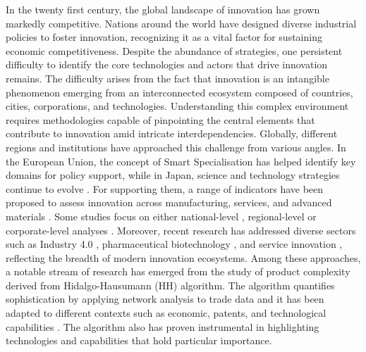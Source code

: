 \documentclass[fleqn,10pt]{wlscirep}
\begin{document}
In the twenty first century, the global landscape of innovation has grown markedly competitive. 
Nations around the world have designed diverse industrial policies to foster innovation, recognizing it as a vital factor for sustaining economic competitiveness. 
Despite the abundance of strategies, one persistent difficulty to identify the core technologies and actors that drive innovation remains. 
The difficulty arises from the fact that innovation is an intangible phenomenon emerging from an interconnected ecosystem composed of countries, cities, corporations, and technologies. 
Understanding this complex environment requires methodologies capable of pinpointing the central elements that contribute to innovation amid intricate interdependencies.
Globally, different regions and institutions have approached this challenge from various angles. 
In the European Union, the concept of Smart Specialisation \cite{EC_SSP_nodate,Teixeira2022} has helped identify key domains for policy support, while in Japan, science and technology strategies continue to evolve \cite{NISTEP_nodate}. For supporting them, a range of indicators have been proposed to assess innovation across manufacturing, services, and advanced materials \cite{Taques2021,Farcal2023}. 
Some studies focus on either national-level \cite{Teixeira2022,Abay2024}, regional-level \cite{Balland2018,PintarScherngell2022,Pinheiro2022,Whittle2019} or corporate-level analyses \cite{Bruno2018,Buccellato2016,Kito2018}. 
Moreover, recent research has addressed diverse sectors such as Industry 4.0 \cite{Teixeira2022}, pharmaceutical biotechnology \cite{Sakakibara2014,Nakamura2022,Bhatia2018,Murakami2024}, and service innovation \cite{Taques2021}, reflecting the breadth of modern innovation ecosystems.
Among these approaches, a notable stream of research has emerged from the study of product complexity derived from Hidalgo-Hausumann (HH) algorithm\cite{Hidalgo2009}. 
The algorithm quantifies sophistication by applying network analysis to trade data and it has been adapted to different contexts such as economic, patents, and technological capabilities \cite{Hidalgo2021,Hidalgo2023,Hausmann2024,Balland2022,Chakraborty2020}. 
The algorithm also has proven instrumental in highlighting technologies and capabilities that hold particular importance. 
\end{document}
